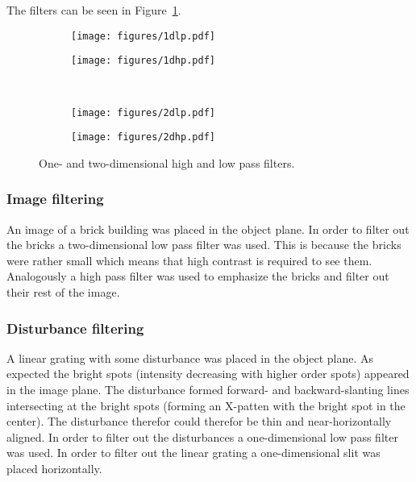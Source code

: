 \documentclass[12pt,a4paper]{article}
\begin{document}
The filters can be seen in Figure~\ref{fig:filters}.
\begin{figure}[h]
  \centering
  \begin{subfigure}[b]{0.45\textwidth}
    \texttt{[image: figures/1dlp.pdf]}
  \end{subfigure}
  \begin{subfigure}[b]{0.45\textwidth}
    \texttt{[image: figures/1dhp.pdf]}
  \end{subfigure}\\
  \begin{subfigure}[b]{0.45\textwidth}
    \texttt{[image: figures/2dlp.pdf]}
  \end{subfigure}
  \begin{subfigure}[b]{0.45\textwidth}
    \texttt{[image: figures/2dhp.pdf]}
  \end{subfigure}
  \caption{One- and two-dimensional high and low pass filters.}
  \label{fig:filters}
\end{figure}

\subsubsection{Image filtering}
An image of a brick building was placed in the object plane. In order to filter out the bricks a two-dimensional low pass filter was used. This is because the bricks were rather small which means that high contrast is required to see them. Analogously a high pass filter was used to emphasize the bricks and filter out their rest of the image.

\subsubsection{Disturbance filtering}
A linear grating with some disturbance was placed in the object plane. As expected the bright spots (intensity decreasing with higher order spots) appeared in the image plane. The disturbance formed forward- and backward-slanting lines intersecting at the bright spots (forming an X-patten with the bright spot in the center). The disturbance  therefor could therefor be thin and near-horizontally aligned.
In order to filter out the disturbances a one-dimensional low pass filter was used.
In order to filter out the linear grating a one-dimensional slit was placed horizontally.
\end{document}
